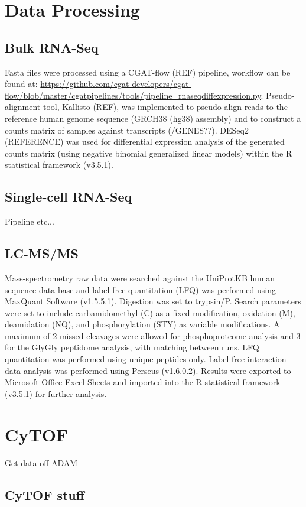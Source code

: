 \section{Data Processing}
\subsection{Bulk RNA-Seq}
Fasta files were processed using a CGAT-flow (REF) pipeline, workflow can be found at: \url{https://github.com/cgat-developers/cgat-flow/blob/master/cgatpipelines/tools/pipeline_rnaseqdiffexpression.py}. Pseudo-alignment tool, Kallisto (REF), was implemented to pseudo-align reads to the reference human genome sequence (GRCH38 (hg38) assembly) and to construct a counts matrix of samples against transcripts (/GENES??). DESeq2 (REFERENCE) was used for differential expression analysis of the generated  counts  matrix  (using  negative  binomial  generalized  linear  models) within the R statistical framework (v3.5.1).

\subsection{Single-cell RNA-Seq}
Pipeline etc...

\subsection{LC-MS/MS}
Mass-spectrometry raw data were searched against the UniProtKB human sequence data base and label-free quantitation (LFQ) was performed using MaxQuant Software (v1.5.5.1). Digestion was set to trypsin/P. Search parameters were set to include carbamidomethyl (C) as a fixed modification, oxidation (M), deamidation (NQ), and phosphorylation (STY) as variable modifications. A maximum of 2 missed cleavages were allowed for phosphoproteome analysis and 3 for the GlyGly peptidome analysis, with matching between runs. LFQ quantitation was performed using unique peptides only. Label-free interaction data analysis was performed using Perseus (v1.6.0.2). Results were exported to Microsoft Office Excel Sheets and imported into the R statistical framework (v3.5.1) for further analysis. 


\section{CyTOF}
Get data off ADAM
\subsection{CyTOF stuff}
